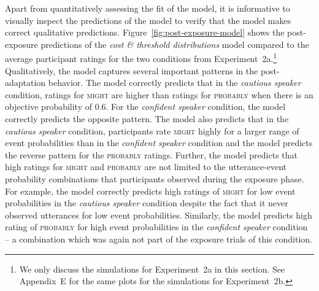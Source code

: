 \documentclass[man, floatsintext]{apa6}
\begin{document}
Apart from quantitatively assessing the fit of the model, it is informative to visually inspect the predictions of the model to verify that the model makes correct qualitative predictions. 
Figure~\ref{fig:post-exposure-model} shows the post-exposure predictions of the \textit{cost \& threshold distributions} model compared to the average participant ratings for the two conditions from Experiment~2a.\footnote{
We only discuss the simulations for Experiment~2a in this section. See Appendix~E for the same plots for the simulations for Experiment~2b.} Qualitatively, 
the model captures several important patterns in the post-adaptation behavior. The model correctly predicts that in the \textit{cautious speaker} condition, ratings for \textsc{might} are 
higher than ratings for \textsc{probably} when there is an objective probability of 0.6. For the \textit{confident speaker} condition, the model correctly predicts the
opposite pattern. The model also predicts that in the \textit{cautious speaker} condition, participants rate \textsc{might} highly for a larger range of event probabilities than
in the \textit{confident speaker} condition and the model predicts the  reverse pattern for the \textsc{probably} ratings. Further, the model predicts that high ratings for \textsc{might} 
and \textsc{probably} are not limited to the utterance-event probability combinations that participants observed during the exposure phase. For example, the model correctly predicts
high ratings of \textsc{might} for low event probabilities in the \textit{cautious speaker} condition despite the fact that it never observed utterances for low event probabilities. Similarly,
the model predicts high rating of \textsc{probably} for high event probabilities in the \textit{confident speaker} condition -- a combination which was again not part of the exposure trials
of this condition.
\end{document}
